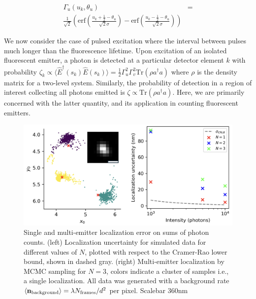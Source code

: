 \documentclass[a4paper, twocolumn, superscriptaddress,prl]{revtex4}  %
\begin{document}
\begin{align*}
\Gamma_{u}(u_k,\theta_{u}) &= \\ \frac{1}{\sqrt{2}}\left(\mathrm{erf}\left(\frac{u_k+\frac{1}{2}-\theta_{u}}{\sqrt{2}\sigma}\right) -\mathrm{erf}\left(\frac{u_k-\frac{1}{2}-\theta_{u}}{\sqrt{2}\sigma}\right)\right)
\end{align*}

We now consider the case of pulsed excitation where the interval between pulses much longer than the fluorescence lifetime. Upon excitation of an isolated fluorescent emitter, a photon is detected at a particular detector element $k$ with probability $\zeta_k \propto \langle \hat{E}^{\dagger}(s_k)\hat{E}(s_k)\rangle = \frac{1}{2}\Gamma_{u}^2 \Gamma_{v}^2\mathrm{Tr}(\rho a^{\dagger}a)$ where $\rho$ is the density matrix for a two-level system. Similarly, the probability of detection in a region of interest collecting all photons emitted is $\zeta\propto \mathrm{Tr}(\rho a^{\dagger}a)$. Here, we are primarily concerned with the latter quantity, and its application in counting fluorescent emitters.

\begin{figure}
\includegraphics[width=12cm]{media/Figure-5.png}
\caption{Single and multi-emitter localization error on sums of photon counts. (left) Localization uncertainty for simulated data for different values of $N$, plotted with respect to the Cramer-Rao lower bound, shown in dashed gray. (right) Multi-emitter localization by MCMC sampling for $N=3$, colors indicate a cluster of samples i.e., a single localization. All data was generated with a background rate $\langle \bold{n}_{\mathrm{background}} \rangle = \lambda N_{\mathrm{frames}}/d^{2}$ per pixel. Scalebar 360nm}
\end{figure}   
\end{document}
